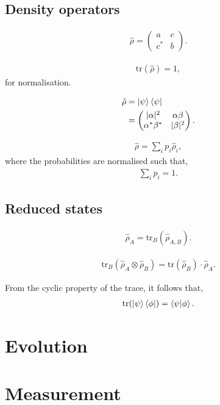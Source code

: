\documentclass[aps,pra,twocolumn,amsmath,amssymb,nofootinbib,superscriptaddress]{revtex4}
\begin{document}
%
%

\subsection{Density operators}

\begin{align}
\hat\rho = \left(\begin{matrix}{}
  a & c \nonumber\\
  c^* & b
\end{matrix}\right).
\end{align}

\begin{align}
\mathrm{tr}(\hat\rho)=1,	
\end{align}
for normalisation.

\begin{align}
\hat\rho &= \ket\psi\bra\psi\nonumber\\
&= \left(\begin{matrix}{}
  |\alpha|^2 & \alpha\beta \nonumber\\
  \alpha^*\beta^* & |\beta|^2
\end{matrix}\right).
\end{align}

\begin{align}
	\hat\rho = \sum_i p_i \hat\rho_i,
\end{align}
where the probabilities are normalised such that,
\begin{align}
	\sum_i p_i = 1.
\end{align}

%
%

\subsection{Reduced states}

\begin{align}
\hat\rho_A = \mathrm{tr}_B(\hat\rho_{A,B}).	
\end{align}

\begin{align}
\mathrm{tr}_B(\hat\rho_A\otimes\hat\rho_B) = \mathrm{tr}(\hat\rho_B) \cdot \hat\rho_A.
\end{align}

From the cyclic property of the trace, it follows that,
\begin{align}
\mathrm{tr}(\ket\psi\bra\phi) = \braket{\psi|\phi}.	
\end{align}

%
%

\section{Evolution}

%
%

\section{Measurement}
\end{document}
